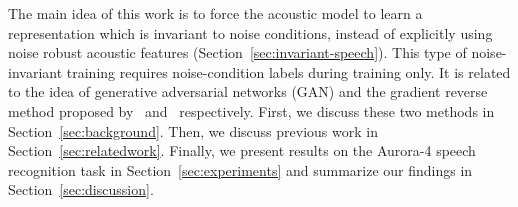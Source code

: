 \documentclass[a4paper]{article}
\begin{document}
    The main idea of this work is to force the acoustic model 
    to learn a representation which is invariant to noise conditions, instead of 
    explicitly using noise robust acoustic features 
    (Section~\ref{sec:invariant-speech}). This type of noise-invariant 
    training requires noise-condition labels during training only. It is 
    related to the idea of generative adversarial networks (GAN) and the 
    gradient reverse method proposed by~\cite{goodfellow2014generative} 
    and~\cite{ganin2014unsupervised} respectively. 
    First, we discuss these two methods in Section~\ref{sec:background}.
    Then, we discuss previous work in Section~\ref{sec:relatedwork}. 
    Finally, we present results on the Aurora-4 speech 
    recognition task in Section~\ref{sec:experiments} and summarize 
    our findings in Section~\ref{sec:discussion}.
\end{document}
